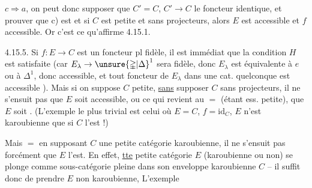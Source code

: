 $c\Longrightarrow a$,  on peut donc supposer que $C'=C$, $C'\longrightarrow C$ le foncteur identique, et prouver que  c) est  et si $C$ est petite et sans projecteurs, alors $E$ est accessible et $f$ accessible. Or c'est ce qu'affirme 4.15.1.

\uline{} 4.15.5. Si $f:E\longrightarrow C$ est un foncteur pl fidèle, il est immédiat que la condition $H$ est satisfaite (car $E_\lambda\to\unsure{\mathbb{\Delta}|\Delta}^1$ sera  fidèle, donc $E_\lambda$ est équivalente à $e$ ou à $\mathbb{\Delta}^1$, donc accessible, et tout foncteur de $E_\lambda$ dans une cat. quelconque est accessible ).
Mais si on suppose $C$ petite, \uline{sans} supposer $C$ sans projecteurs, il ne s'ensuit pas que $E$ soit accessible,  ou ce qui revient au $=$ (étant ess. petite), que $E$ soit .  (L'exemple le plus trivial est celui où $E=C$, $f=\mathrm{id}_C$, $E$ n'est karoubienne que si  $C$ l'est !)

Mais $=$ en supposant $C$  une petite catégorie karoubienne, il ne s'ensuit pas forcément que $E$ l'est.  En effet, \uline{tte} petite catégorie $E$ (karoubienne ou non) se plonge comme sous-catégorie pleine dans  son enveloppe karoubienne $C$ -- il suffit donc de prendre $E$ non karoubienne, L'exemple


